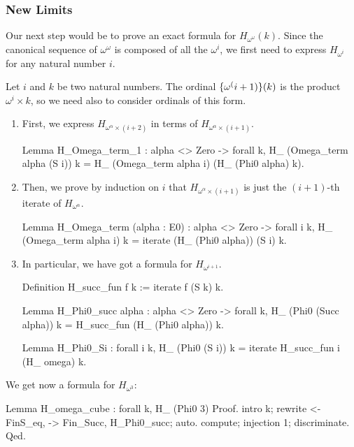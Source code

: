 \subsubsection{New Limits}

Our next step would be to prove an exact formula for $H_{\omega^\omega}(k)$.
Since the canonical sequence of $\omega^\omega$ is composed of all the
$\omega^i$, we first need to express $H_{\omega^i}$ for any natural number $i$.

Let $i$ and $k$ be two natural numbers. 
The ordinal $\mbox{$\{\omega^(i+1)\}(k)$}$ is the product
$\omega^i \times k$, so we need also to consider ordinals of this form.

\begin{enumerate}
\item First,  we express $H_{\omega^\alpha \times (i+2)}$ in terms of
$H_{\omega^\alpha \times (i+1)}$.

\begin{Coqsrc}
Lemma H_Omega_term_1 : alpha <> Zero -> forall  k,  
    H_ (Omega_term alpha (S i)) k =
    H_ (Omega_term alpha i) (H_ (Phi0 alpha) k).
\end{Coqsrc}

\item
Then, we prove by induction on $i$ that $H_{\omega^\alpha \times (i+1)}$ is just the
$(i+1)$-th iterate of $H_{\omega^\alpha}$.


\begin{Coqsrc}
Lemma H_Omega_term (alpha : E0)  :
alpha <> Zero -> forall i k, 
  H_ (Omega_term alpha i) k = iterate  (H_ (Phi0 alpha)) (S i) k.
\end{Coqsrc}

\item In particular, we have got a formula for $H_{\omega^{i+1}}$.

\begin{Coqsrc}
Definition H_succ_fun f k := iterate f (S k) k.

Lemma H_Phi0_succ alpha  : alpha <> Zero -> forall k,
      H_ (Phi0 (Succ alpha)) k = H_succ_fun (H_ (Phi0 alpha)) k. 

Lemma H_Phi0_Si : forall i k,
      H_ (Phi0 (S i)) k = iterate H_succ_fun i (H_ omega) k. 
\end{Coqsrc}

\end{enumerate}
We get now a  formula for $H_{\omega^3}$:

\begin{Coqsrc}
Lemma H_omega_cube : forall k,
    H_ (Phi0 3)%
Proof.
  intro k; rewrite <-FinS_eq, -> Fin_Succ, H_Phi0_succ; auto.
  compute; injection 1; discriminate.
Qed.
\end{Coqsrc}

